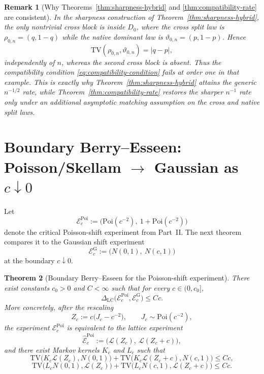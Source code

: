 \documentclass{article}
\newtheorem{theorem}{Theorem}[section]
\newtheorem{remark}[theorem]{Remark}
\newcommand{\TV}{\mathrm{TV}}
\newcommand{\Poi}{\mathrm{Poi}}
\newcommand{\LC}{\Delta_{\mathrm{LC}}}
\newcommand{\1}{\mathbf 1}
\begin{document}
\begin{remark}[Why Theorems~\ref{thm:sharpness-hybrid} and \ref{thm:compatibility-rate} are consistent]
In the sharpness construction of Theorem~\ref{thm:sharpness-hybrid}, the only nontrivial cross block is inside
$D_0$, where the cross split law is $\rho_{0,n}=(q,1-q)$ while the native dominant law is
$\vartheta_{0,n}=(p,1-p)$. Hence
\[
\TV(\rho_{0,n},\vartheta_{0,n})=|q-p|,
\]
independently of $n$, whereas the second cross block is absent. Thus the compatibility condition
\eqref{eq:compatibility-condition} fails at order one in that example. This is exactly why
Theorem~\ref{thm:sharpness-hybrid} attains the generic $n^{-1/2}$ rate, while
Theorem~\ref{thm:compatibility-rate} restores the sharper $n^{-1}$ rate only under an additional asymptotic
matching assumption on the cross and native split laws.
\end{remark}

\section{\texorpdfstring{Boundary Berry--Esseen: Poisson/Skellam $\to$ Gaussian as $c\downarrow 0$}{Boundary Berry--Esseen: Poisson/Skellam to Gaussian as c downarrow 0}}
\label{sec:boundary-BE}

Let
\[
\mathcal E_c^{\mathrm{Poi}}:=\bigl(\Poi(c^{-2}),\ 1+\Poi(c^{-2})\bigr)
\]
denote the critical Poisson-shift experiment from Part~II. The next theorem compares it to the Gaussian shift
experiment
\[
\mathcal E_c^{\mathrm G}:=\bigl(N(0,1),\ N(c,1)\bigr)
\]
at the boundary $c\downarrow 0$.

\begin{theorem}[Boundary Berry--Esseen for the Poisson-shift experiment]
\label{thm:boundary-BE-poisson}
There exist constants $c_0>0$ and $C<\infty$ such that for every $c\in(0,c_0]$,
\[
\LC\bigl(\mathcal E_c^{\mathrm{Poi}},\mathcal E_c^{\mathrm G}\bigr)\le Cc.
\]
More concretely, after the rescaling
\[
Z_c:=c\bigl(J_c-c^{-2}\bigr),\qquad J_c\sim\Poi(c^{-2}),
\]
the experiment $\mathcal E_c^{\mathrm{Poi}}$ is equivalent to the lattice experiment
\[
\widehat{\mathcal E}_c^{\mathrm{Poi}}:=\bigl(\mathcal L(Z_c),\ \mathcal L(Z_c+c)\bigr),
\]
and there exist Markov kernels $K_c$ and $L_c$ such that
\[
\TV\bigl(K_c\mathcal L(Z_c),N(0,1)\bigr)+\TV\bigl(K_c\mathcal L(Z_c+c),N(c,1)\bigr)\le Cc,
\]
\[
\TV\bigl(L_cN(0,1),\mathcal L(Z_c)\bigr)+\TV\bigl(L_cN(c,1),\mathcal L(Z_c+c)\bigr)\le Cc.
\]
\end{theorem}
\end{document}
